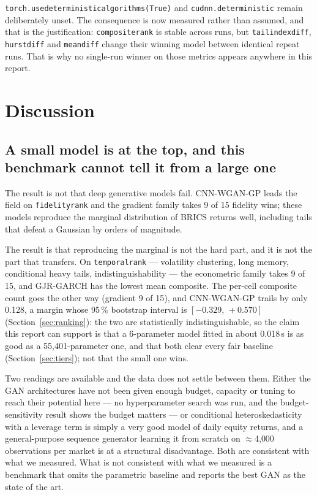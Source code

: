 \documentclass[11pt,a4paper]{article}
\makeatletter
\DeclareRobustCommand{\_}{\ifmmode\nfss@text{\textunderscore}\else\textunderscore\allowbreak\fi}
\makeatother
\begin{document}
\texttt{torch.use\_deterministic\_algorithms(True)} and \texttt{cudnn.deterministic} remain deliberately unset. The consequence is now measured rather than assumed, and that is the justification: \texttt{composite\_rank} is stable across runs, but \texttt{tail\_index\_diff}, \texttt{hurst\_diff} and \texttt{mean\_diff} change their winning model between identical repeat runs. That is why no single-run winner on those metrics appears anywhere in this report.
\section{Discussion}
\label{sec:discussion}

\subsection{A small model is at the top, and this benchmark cannot tell it from a large one}
The result is not that deep generative models fail. CNN-WGAN-GP leads the field on \texttt{fidelity\_rank} and the gradient family takes 9 of 15 fidelity wins; these models reproduce the marginal distribution of BRICS returns well, including tails that defeat a Gaussian by orders of magnitude.

The result is that reproducing the marginal is not the hard part, and it is not the part that transfers. On \texttt{temporal\_rank} --- volatility clustering, long memory, conditional heavy tails, indistinguishability --- the econometric family takes 9 of 15, and GJR-GARCH has the lowest mean composite. The per-cell composite count goes the other way (gradient 9 of 15), and CNN-WGAN-GP trails by only 0.128, a margin whose 95\,\% bootstrap interval is $[-0.329,\,+0.570]$ (Section~\ref{sec:ranking}): the two are statistically indistinguishable, so the claim this report can support is that a 6-parameter model fitted in about 0.018\,s is as good as a 55{,}401-parameter one, and that both clear every fair baseline (Section~\ref{sec:tiers}); not that the small one wins.

Two readings are available and the data does not settle between them. Either the GAN architectures have not been given enough budget, capacity or tuning to reach their potential here --- no hyperparameter search was run, and the budget-sensitivity result shows the budget matters --- or conditional heteroskedasticity with a leverage term is simply a very good model of daily equity returns, and a general-purpose sequence generator learning it from scratch on $\approx$4{,}000 observations per market is at a structural disadvantage. Both are consistent with what we measured. What is not consistent with what we measured is a benchmark that omits the parametric baseline and reports the best GAN as the state of the art.
\end{document}
